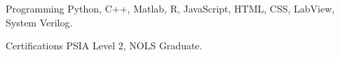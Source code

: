 

\begin{cvskills}

  \cvskill
    {Programming} %
    {Python, C++, Matlab, R, JavaScript, HTML, CSS, LabView, System Verilog.} %

  \cvskill
    {Certifications} %
    {PSIA Level 2, NOLS Graduate.} %

\end{cvskills}
